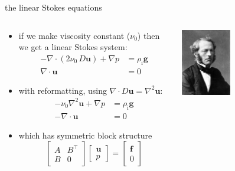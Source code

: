 \documentclass[10pt,
               hyperref={colorlinks,citecolor=DeepPink4,linkcolor=black,urlcolor=blue},
               svgnames]{beamer}
\newcommand{\bbf}{\mathbf{f}}
\newcommand{\bu}{\mathbf{u}}
\newcommand{\Div}{\nabla\cdot}
\newcommand{\rhoi}{\rho_{\text{i}}}
\begin{document}
\begin{frame}{the linear Stokes equations}

\begin{columns}

\begin{column}{0.6\textwidth}
\begin{itemize}
\item if we make viscosity constant ($\nu_0$) then we get a linear Stokes system:
\begin{align*}
- \nabla \cdot \left(2 \nu_0\, D\bu\right) + \nabla p &= \rhoi \mathbf{g}  \\
\Div \bu &= 0
\end{align*}
\item with reformatting, using $\nabla \cdot D\bu = \nabla^2 \bu$:
\begin{align*}
- \nu_0 \nabla^2 \bu + \nabla p &= \rhoi \mathbf{g}  \\
-\Div \bu \qquad \,\,\,\, &= 0
\end{align*}
\item which has symmetric block structure
  $$\begin{bmatrix} A & B^\top \\ B & 0 \end{bmatrix} \begin{bmatrix} \bu \\ p  \end{bmatrix} = \begin{bmatrix} \bbf \\ 0 \end{bmatrix}$$
\end{itemize}
\end{column}

\begin{column}{0.4\textwidth}
\hfill \includegraphics[width=0.4\textwidth]{figs/people/gstokes.jpg}


\end{column}
\end{columns}
\end{frame}
\end{document}
